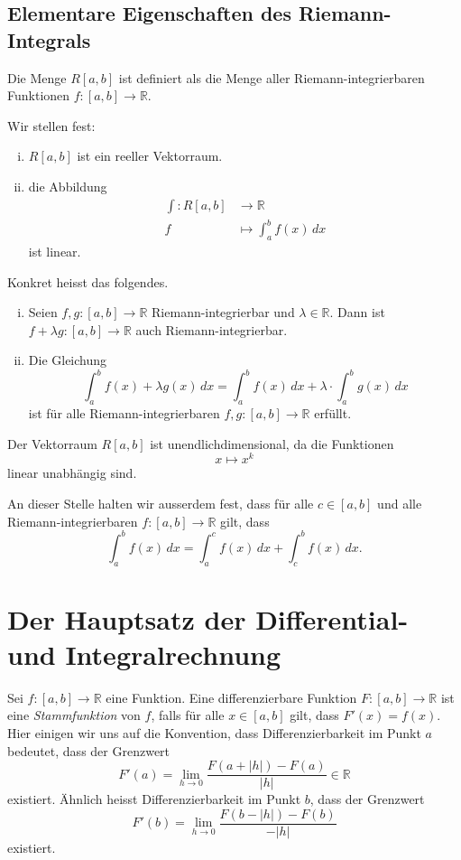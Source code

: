 \documentclass[../main.tex]{subfiles}
\begin{document}
\subsection*{Elementare Eigenschaften des Riemann-Integrals}
\begin{notation}
  Die Menge $R[a, b]$ ist definiert als
  die Menge aller Riemann-integrierbaren Funktionen
  $f \colon [a, b] \to \mathbb{R}$.
\end{notation}

Wir stellen fest:
\begin{enumerate}[(i)]
  \item $R[a, b]$ ist ein reeller Vektorraum.
  \item die Abbildung
    \begin{align*}
      \int \colon R[a,b] & \to \mathbb{R} \\
      f & \mapsto \int_{a}^{b} f(x) \, dx
    \end{align*}
    ist linear.
\end{enumerate}
Konkret heisst das folgendes.
\begin{enumerate}[(i)]
  \item Seien $f, g \colon [a, b] \to \mathbb{R}$
    Riemann-integrierbar und $\lambda \in \mathbb{R}$.
    Dann ist $f + \lambda g \colon [a, b] \to \mathbb{R}$ 
    auch Riemann-integrierbar.
  \item Die Gleichung
    \[
      \int_{a}^{b} f(x) + \lambda g(x) \, dx
      = \int_{a}^{b} f(x) \, dx
      + \lambda \cdot \int_{a}^{b} g(x) \, dx
    \]
    ist für alle Riemann-integrierbaren 
    $f, g \colon [a, b] \to \mathbb{R}$ 
    erfüllt.
\end{enumerate}

\begin{remark}
  Der Vektorraum $R[a,b]$ ist unendlichdimensional, da die
  Funktionen 
  \[
   x \mapsto x^k 
  \]
  linear unabhängig sind.
\end{remark}

An dieser Stelle halten wir ausserdem fest, dass
für alle $c \in [a, b]$ und alle Riemann-integrierbaren
$f \colon [a, b] \to \mathbb{R}$ gilt, dass
\[
  \int_{a}^{b} f(x) \, dx = \int_{a}^{c} f(x) \, dx
  + \int_{c}^{b} f(x) \, dx.
\]

\section{Der Hauptsatz der Differential- und Integralrechnung}
\begin{definition}
  Sei $f \colon [a, b] \to \mathbb{R}$ eine Funktion.
  Eine differenzierbare
  Funktion $F \colon [a, b] \to \mathbb{R}$ ist
  eine \emph{Stammfunktion} von $f$, falls für
  alle $x \in [a, b]$ gilt, dass $F'(x) = f(x)$.
  Hier einigen wir uns auf die Konvention,
  dass Differenzierbarkeit im Punkt $a$ bedeutet, dass
  der Grenzwert
  \[
    F'(a) 
    = \lim_{h \to 0} \frac{F(a + |h|) - F(a)}{|h|} \in \mathbb{R}
  \]
  existiert. Ähnlich heisst Differenzierbarkeit im Punkt $b$,
  dass der Grenzwert
  \[
    F'(b) = \lim_{h \to 0} \frac{F(b - |h|) - F(b)}{-|h|}
  \]
  existiert.
\end{definition}
\end{document}
